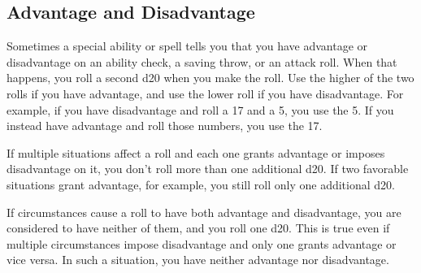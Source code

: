 \subsection{Advantage and Disadvantage}
Sometimes a special ability or spell tells you that you have advantage or disadvantage on an ability check, a saving throw, or an attack roll. When that happens, you roll a second d20 when you make the roll. Use the higher of the two rolls if you have advantage, and use the lower roll if you have disadvantage. For example, if you have disadvantage and roll a 17 and a 5, you use the 5. If you instead have advantage and roll those numbers, you use the 17.

If multiple situations affect a roll and each one grants advantage or imposes disadvantage on it, you don't roll more than one additional d20. If two favorable situations grant advantage, for example, you still roll only one additional d20.

If circumstances cause a roll to have both advantage and disadvantage, you are considered to have neither of them, and you roll one d20. This is true even if multiple circumstances impose disadvantage and only one grants advantage or vice versa. In such a situation, you have neither advantage nor disadvantage.

